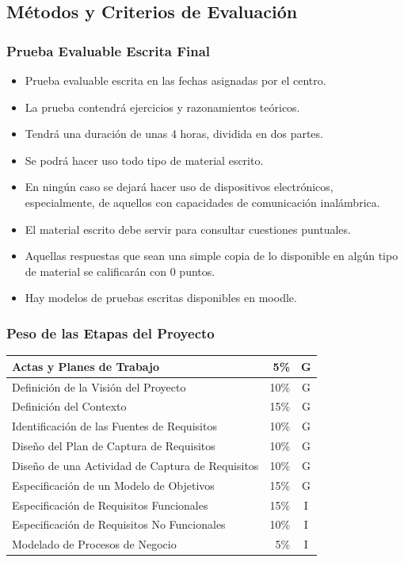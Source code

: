 \documentclass[handout,a4paper,slidestop,xcolor=pst,dvips,blue]{beamer}
\begin{document}
\subsection{Métodos y Criterios de Evaluación}

\begin{frame}
	\frametitle{Prueba Evaluable Escrita Final}
	\begin{itemize}[<+->]
		\item Prueba evaluable escrita en las fechas asignadas por el centro.
		\item La prueba contendrá ejercicios y razonamientos teóricos.
		\item Tendrá una duración de unas 4 horas, dividida en dos partes.
        \item Se podrá hacer uso todo tipo de material escrito.
        \item En ningún caso se dejará hacer uso de dispositivos electrónicos, especialmente, de aquellos con capacidades de comunicación inalámbrica.
		\item \alert{El material escrito debe servir para consultar cuestiones puntuales}.
		\item Aquellas respuestas que sean una simple copia de lo disponible en algún tipo de material se calificarán con 0 puntos.
        \item Hay modelos de pruebas escritas disponibles en moodle.
	\end{itemize}
\end{frame}

\begin{frame}[c]
	\frametitle{Peso de las Etapas del Proyecto}
    \begin{center}
	\begin{tabular}{||l|r|c||}
    \hline \hline
    Actas y Planes de Trabajo                   &  5\% & G \\ \hline
    Definición de la Visión del Proyecto        & 10\% & G \\ \hline
    Definición del Contexto                     & 15\% & G \\ \hline
    Identificación de las Fuentes de Requisitos & 10\% & G \\ \hline
    Diseño del Plan de Captura de Requisitos    & 10\% & G \\ \hline \hline
    Diseño de una Actividad de Captura de Requisitos & 10\% & G \\ \hline
    Especificación de un Modelo de Objetivos    & 15\% & G \\ \hline
    Especificación de Requisitos Funcionales    & 15\% & I \\ \hline
    Especificación de Requisitos No Funcionales & 10\% & I \\ \hline \hline
    Modelado de Procesos de Negocio             &  5\% & I \\ \hline \hline
	\end{tabular}
\end{center}
\end{frame}
\end{document}
